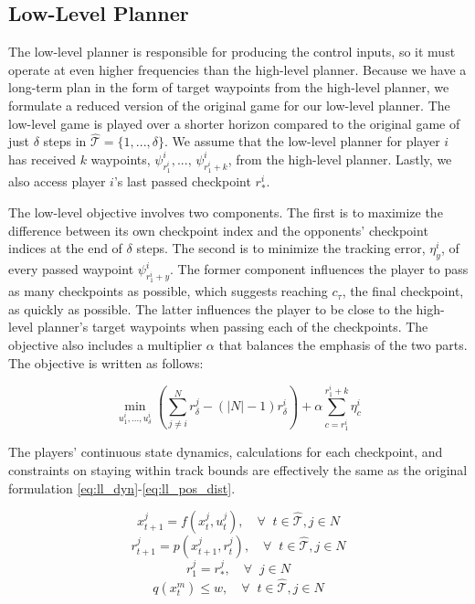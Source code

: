 \subsection{Low-Level Planner}
The low-level planner is responsible for producing the control inputs, so it must operate at even higher frequencies than the high-level planner. Because we have a long-term plan in the form of target waypoints from the high-level planner, we formulate a reduced version of the original game for our low-level planner. The low-level game is played over a shorter horizon compared to the original game of just $\delta$ steps in $\hat{\mathcal{T}} = \{1, ..., \delta\}$. We assume that the low-level planner for player $i$ has received $k$ waypoints, $\psi^i_{r^i_{1}}, ..., \, \psi^i_{r^i_{1} + k}$, from the high-level planner. Lastly, we also access player $i$'s last passed checkpoint $r^i_*$. 

The low-level objective involves two components. The first is to maximize the difference between its own checkpoint index and the opponents' checkpoint indices at the end of $\delta$ steps. The second is to minimize the tracking error, $\eta^i_y$, of every passed waypoint $\psi^i_{r^i_{1}+y}$. The former component influences the player to pass as many checkpoints as possible, which suggests reaching $c_\tau$, the final checkpoint, as quickly as possible. The latter influences the player to be close to the high-level planner's target waypoints when passing each of the checkpoints. The objective also includes a multiplier $\alpha$ that balances the emphasis of the two parts. The objective is written as follows:

\begin{equation} \label{eq:ll_obj}
    \min_{u^i_{1}, ..., u^i_{\delta}} (\sum^N_{j \neq i}r^j_{\delta} - (|N|-1) r^i_{\delta}) + \alpha \sum_{c={r^i_{1}}}^{{r^i_{1}}+k} \eta^i_c
\end{equation}

The players' continuous state dynamics, calculations for each checkpoint, and constraints on staying within track bounds  are effectively the same as the original formulation \eqref{eq:ll_dyn}-\eqref{eq:ll_pos_dist}. 

\begin{equation} \label{eq:ll_dyn}
    x^j_{t+1} = f(x^j_{t}, u^j_t), \quad \forall \;\; t \in \hat{\mathcal{T}}, j \in N
\end{equation}
\begin{equation} \label{eq::ll_pos}
    r^j_{t+1} = p(x^j_{t+1}, r^j_t), \quad \forall \;\; t \in \hat{\mathcal{T}}, j \in N
\end{equation}
\begin{equation} \label{eq::ll_pos_init}
    r^j_{1} = r^j_*, \quad \forall\;\; j \in N
\end{equation}
\begin{equation} \label{eq:ll_pos_dist}
    q(x^m_{t}) \leq w, \quad \forall \;\; t \in \hat{\mathcal{T}}, j \in N
\end{equation}

